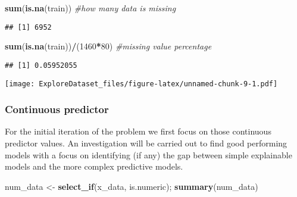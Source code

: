 \documentclass[]{article}
\newenvironment{Shaded}{\begin{snugshade}}{\end{snugshade}}
\newcommand{\CommentTok}[1]{\textcolor[rgb]{0.56,0.35,0.01}{\textit{#1}}}
\newcommand{\DecValTok}[1]{\textcolor[rgb]{0.00,0.00,0.81}{#1}}
\newcommand{\KeywordTok}[1]{\textcolor[rgb]{0.13,0.29,0.53}{\textbf{#1}}}
\newcommand{\NormalTok}[1]{#1}
\newcommand{\OperatorTok}[1]{\textcolor[rgb]{0.81,0.36,0.00}{\textbf{#1}}}
\newcommand{\StringTok}[1]{\textcolor[rgb]{0.31,0.60,0.02}{#1}}
\begin{document}
\begin{Shaded}
\begin{Highlighting}[]
\KeywordTok{sum}\NormalTok{(}\KeywordTok{is.na}\NormalTok{(train)) }\CommentTok{#how many data is missing}
\end{Highlighting}
\end{Shaded}

\begin{verbatim}
## [1] 6952
\end{verbatim}

\begin{Shaded}
\begin{Highlighting}[]
\KeywordTok{sum}\NormalTok{(}\KeywordTok{is.na}\NormalTok{(train))}\OperatorTok{/}\NormalTok{(}\DecValTok{1460}\OperatorTok{*}\DecValTok{80}\NormalTok{) }\CommentTok{#missing value percentage}
\end{Highlighting}
\end{Shaded}

\begin{verbatim}
## [1] 0.05952055
\end{verbatim}

\begin{Shaded}
\end{Shaded}

\texttt{[image: ExploreDataset\_files/figure-latex/unnamed-chunk-9-1.pdf]}

\hypertarget{continuous-predictor}{%
\subsubsection{Continuous predictor}\label{continuous-predictor}}

For the initial iteration of the problem we first focus on those
continuous predictor values. An investigation will be carried out to
find good performing models with a focus on identifying (if any) the gap
between simple explainable models and the more complex predictive
models.

\begin{Shaded}
\begin{Highlighting}[]
\NormalTok{num_data <-}\StringTok{ }\KeywordTok{select_if}\NormalTok{(x_data, is.numeric); }
\KeywordTok{summary}\NormalTok{(num_data)}
\end{Highlighting}
\end{Shaded}
\end{document}

